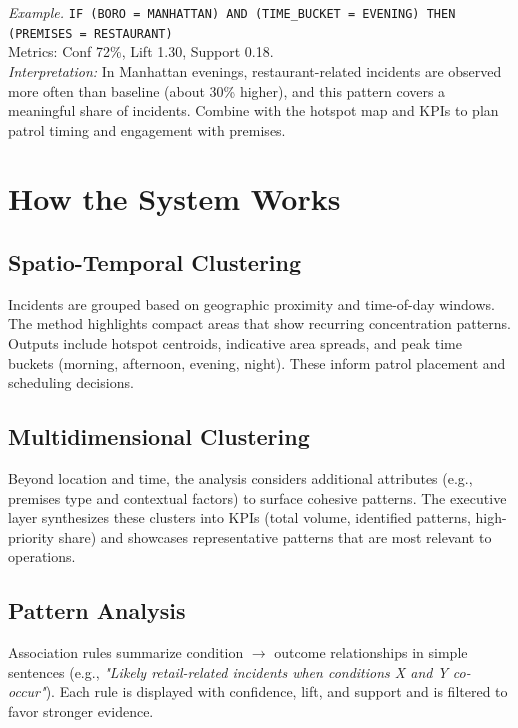 \documentclass[11pt]{article}
\begin{document}
\noindent\textit{Example.}\; \texttt{IF (BORO = MANHATTAN) AND (TIME\_BUCKET = EVENING) THEN (PREMISES = RESTAURANT)}\\
\quad Metrics: Conf 72\%, Lift 1.30, Support 0.18.\\
\emph{Interpretation:} In Manhattan evenings, restaurant-related incidents are observed more often than baseline (about 30\% higher), and this pattern covers a meaningful share of incidents. Combine with the hotspot map and KPIs to plan patrol timing and engagement with premises.

\section{How the System Works}

\subsection{Spatio-Temporal Clustering}
Incidents are grouped based on geographic proximity and time-of-day windows. The method highlights compact areas that show recurring concentration patterns. Outputs include hotspot centroids, indicative area spreads, and peak time buckets (morning, afternoon, evening, night). These inform patrol placement and scheduling decisions.

\subsection{Multidimensional Clustering}
Beyond location and time, the analysis considers additional attributes (e.g., premises type and contextual factors) to surface cohesive patterns. The executive layer synthesizes these clusters into KPIs (total volume, identified patterns, high-priority share) and showcases representative patterns that are most relevant to operations.

\subsection{Pattern Analysis}
Association rules summarize condition $\rightarrow$ outcome relationships in simple sentences (e.g., \emph{"Likely retail-related incidents when conditions X and Y co-occur"}). Each rule is displayed with confidence, lift, and support and is filtered to favor stronger evidence.

\end{document}
